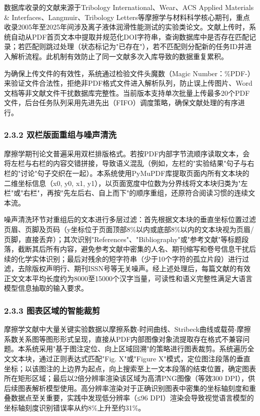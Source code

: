 数据库收录的文献来源于Tribology International、Wear、ACS Applied Materials \& Interfaces、Langmuir、Tribology Letters等摩擦学与材料科学核心期刊，重点收录2005年至2025年间涉及离子液体润滑性能测试的实验类论文。文献上传时，系统自动从PDF首页文本中提取并规范化DOI字符串，查询数据库中是否存在匹配记录；若匹配则跳过处理（状态标记为"已存在"），若不匹配则分配新的任务ID并进入解析流程。此机制有效防止了同一文献多次入库导致的数据重复累积。

为确保上传文件的有效性，系统通过检验文件头魔数（Magic Number：\%PDF-）来验证文件合法性，拒绝非PDF格式文件进入解析队列，防止误上传图片、Word文档等非文献文件干扰数据库完整性。当前版本支持单次批量上传最多20个PDF文件，后台任务队列采用先进先出（FIFO）调度策略，确保文献处理的有序进行。

\hypertarget{ux53ccux680fux7248ux9762ux91cdux7ec4ux4e0eux566aux58f0ux6e05ux6d17}{%
\subsubsection{2.3.2 双栏版面重组与噪声清洗}\label{ux53ccux680fux7248ux9762ux91cdux7ec4ux4e0eux566aux58f0ux6e05ux6d17}}

摩擦学期刊论文普遍采用双栏排版格式。若按PDF内部字节流顺序读取文本，会将左栏与右栏的内容交错拼接，导致语义混乱（例如，左栏的"实验结果"句子与右栏的"讨论"句子交织在一起）。本系统使用PyMuPDF库提取页面内所有文本块的二维坐标信息（x0, y0, x1, y1），以页面宽度中位数为分界线将文本块归类为"左栏"或"右栏"，再按"先左后右、自上而下"的顺序重组，还原符合阅读习惯的连续文本流。

噪声清洗环节对重组后的文本进行多层过滤：首先根据文本块的垂直坐标位置过滤页眉、页脚及页码（y坐标位于页面顶部8\%以内或底部8\%以内的文本块视为页眉/页脚，直接丢弃）；其次识别"References"、"Bibliography"或"参考文献"等标题段落，截断其后所有内容，避免参考文献中密集的人名、期刊缩写和卷号信息干扰后续的化学实体识别；最后对残余的短字符串（少于10个字符的孤立片段）进行过滤，去除版权声明行、期刊ISSN号等无关噪声。经上述处理后，每篇文献的有效正文文本平均长度约为8000至15000个汉字当量，可读性和语义完整性满足大语言模型信息抽取的输入要求。

\hypertarget{ux56feux8868ux533aux57dfux7684ux667aux80fdux88c1ux526a}{%
\subsubsection{2.3.3 图表区域的智能裁剪}\label{ux56feux8868ux533aux57dfux7684ux667aux80fdux88c1ux526a}}

摩擦学文献中大量关键实验数据以摩擦系数-时间曲线、Stribeck曲线或载荷-摩擦系数关系图等图形形式呈现，直接从PDF内部图像对象流提取存在格式不兼容问题。本系统采用"基于图注定位、向上区域回溯"的策略进行图表裁剪。系统遍历全文文本块，通过正则表达式匹配"Fig. X"或"Figure X"模式，定位图注段落的垂直坐标；以该图注的上边界为起点，向上搜索至上一文本段落的结束位置，确定图表所在矩形区域；最后以2倍分辨率渲染该区域为高清PNG图像（等效300 DPI），供后续图表解析模型使用。高分辨率渲染对于正确识别图表中密集的坐标轴刻度和重叠数据点至关重要，实践中发现低分辨率（≤96 DPI）渲染会导致视觉语言模型的坐标轴刻度识别错误率从约8\%上升至约31\%。

